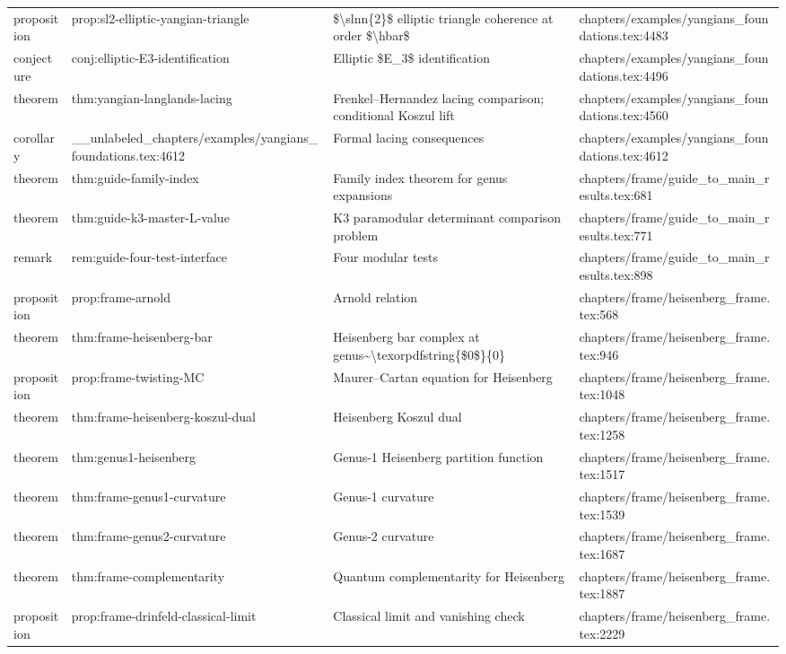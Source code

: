 \documentclass[11pt]{article}
\begin{document}
\begin{longtable}{L{0.10\textwidth}L{0.26\textwidth}L{0.42\textwidth}L{0.22\textwidth}}
proposition & prop:sl2-elliptic-yangian-triangle & \$\textbackslash{}slnn\{2\}\$ elliptic triangle coherence at order \$\textbackslash{}hbar\$ & chapters/examples/yangians\_foundations.tex:4483\\
conjecture & conj:elliptic-E3-identification & Elliptic \$E\_3\$ identification & chapters/examples/yangians\_foundations.tex:4496\\
theorem & thm:yangian-langlands-lacing & Frenkel--Hernandez lacing comparison; cond{}itional Koszul lift & chapters/examples/yangians\_foundations.tex:4560\\
corollary & \_\_unlabeled\_chapters/examples/yangians\_foundations.tex:4612 & Formal lacing consequences & chapters/examples/yangians\_foundations.tex:4612\\
theorem & thm:guide-family-index & Family index theorem for genus expansions & chapters/frame/guide\_to\_main\_results.tex:681\\
theorem & thm:guide-k3-master-L-value & K3 paramodular determinant comparison problem & chapters/frame/guide\_to\_main\_results.tex:771\\
remark & rem:guide-four-test-interface & Four modular tests & chapters/frame/guide\_to\_main\_results.tex:898\\
proposition & prop:frame-arnold & Arnold relation & chapters/frame/heisenberg\_frame.tex:568\\
theorem & thm:frame-heisenberg-bar & Heisenberg bar complex at genus\textasciitilde{}\textbackslash{}texorpdfstring\{\$0\$\}\{0\} & chapters/frame/heisenberg\_frame.tex:946\\
proposition & prop:frame-twisting-MC & Maurer--Cartan equation for Heisenberg & chapters/frame/heisenberg\_frame.tex:1048\\
theorem & thm:frame-heisenberg-koszul-dual & Heisenberg Koszul dual & chapters/frame/heisenberg\_frame.tex:1258\\
theorem & thm:genus1-heisenberg & Genus-1 Heisenberg partition function & chapters/frame/heisenberg\_frame.tex:1517\\
theorem & thm:frame-genus1-curvature & Genus-1 curvature & chapters/frame/heisenberg\_frame.tex:1539\\
theorem & thm:frame-genus2-curvature & Genus-2 curvature & chapters/frame/heisenberg\_frame.tex:1687\\
theorem & thm:frame-complementarity & Quantum complementarity for Heisenberg & chapters/frame/heisenberg\_frame.tex:1887\\
proposition & prop:frame-drinfeld-classical-limit & Classical limit and vanishing check & chapters/frame/heisenberg\_frame.tex:2229\\

\end{longtable}
\end{document}
